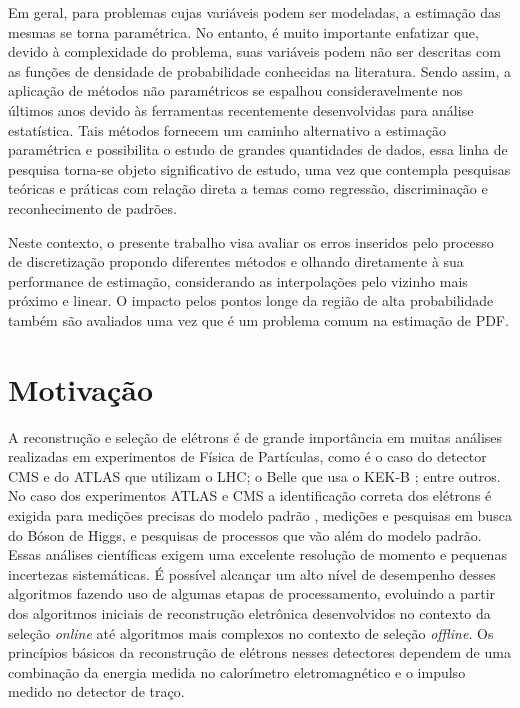 Em geral, para problemas cujas variáveis podem ser modeladas, a estimação das mesmas se torna paramétrica. No entanto, é muito importante enfatizar que, devido à complexidade do problema, suas variáveis podem não ser descritas com as funções de densidade de probabilidade conhecidas na literatura. Sendo assim, a aplicação de métodos não paramétricos se espalhou consideravelmente nos últimos anos devido às ferramentas recentemente desenvolvidas para análise estatística. Tais métodos  fornecem um caminho alternativo a estimação paramétrica e possibilita o estudo de grandes quantidades de dados, essa linha de pesquisa torna-se objeto significativo de estudo, uma vez que contempla pesquisas teóricas e práticas com relação direta a temas como regressão, discriminação e reconhecimento de padrões. 


Neste contexto, o presente trabalho visa avaliar os erros inseridos pelo processo de discretização propondo diferentes métodos e olhando diretamente à sua performance de estimação, considerando as interpolações pelo vizinho mais próximo e linear. O impacto pelos pontos longe da região de alta probabilidade também são avaliados uma vez que é um problema comum na estimação de \ac{PDF}.

\section{Motivação}


A reconstrução e seleção de elétrons é de grande importância em muitas análises realizadas em experimentos de Física de Partículas, como é o caso do detector \ac{CMS} e do \ac{ATLAS} que utilizam o \ac{LHC}; o Belle \cite{hanagaki2002electron} que usa o KEK-B \cite{superk}; entre outros. No caso dos experimentos ATLAS e CMS a identificação correta dos elétrons é exigida para medições precisas do modelo padrão \cite{modelopadrao}, medições e pesquisas em busca do Bóson de Higgs, e pesquisas de processos que vão além do modelo padrão. Essas análises científicas exigem uma excelente resolução de momento e pequenas incertezas sistemáticas. É possível alcançar um alto nível de desempenho desses algoritmos fazendo uso de algumas etapas de processamento, evoluindo a partir dos algoritmos iniciais de reconstrução eletrônica desenvolvidos no contexto da seleção \textit{online} até algoritmos mais complexos no contexto de seleção \textit{offline}. Os princípios básicos da reconstrução de elétrons nesses detectores dependem de uma combinação da energia medida no calorímetro eletromagnético e o impulso medido no detector de traço.

